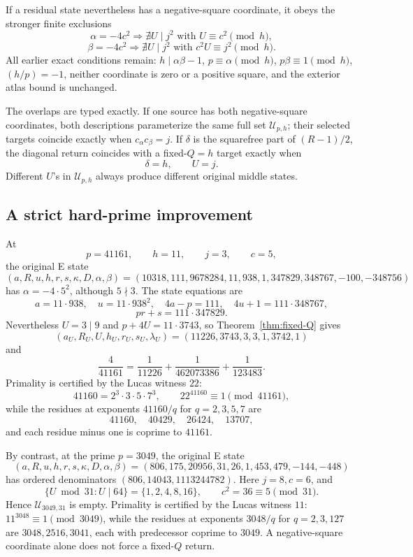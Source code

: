 If a residual state nevertheless has a negative-square coordinate, it obeys
the stronger finite exclusions
\[
 \alpha=-4c^2\Longrightarrow
 \nexists U\mid j^2\text{ with }U\equiv c^2\pmod h,
\]
\[
 \beta=-4c^2\Longrightarrow
 \nexists U\mid j^2\text{ with }c^2U\equiv j^2\pmod h.
\]
All earlier exact conditions remain: \(h\mid\alpha\beta-1\),
\(p\equiv\alpha\pmod h\), \(p\beta\equiv1\pmod h\),
\((h/p)=-1\), neither coordinate is zero or a positive square, and the
exterior atlas bound is unchanged.

The overlaps are typed exactly.  If one source has both negative-square
coordinates, both descriptions parameterize the same full set
\(\mathcal U_{p,h}\); their selected targets coincide exactly when
\(c_\alpha c_\beta=j\).  If \(\delta\) is the squarefree part of
\((R-1)/2\), the diagonal return coincides with a fixed-\(Q=h\) target exactly
when
\[
 \delta=h,\qquad U=j.
\]
Different \(U\)'s in \(\mathcal U_{p,h}\) always produce different original
middle states.

\subsection{A strict hard-prime improvement}

At
\[
 p=41161,\qquad h=11,\qquad j=3,\qquad c=5,
\]
the original E state
\[
 (a,R,u,h,r,s,\kappa,D,\alpha,\beta)
 =(10318,111,9678284,11,938,1,347829,348767,-100,-348756)
\]
has \(\alpha=-4\cdot5^2\), although \(5\nmid3\).  The state equations are
\[
 a=11\cdot938,\quad u=11\cdot938^2,\quad
 4a-p=111,\quad4u+1=111\cdot348767,
\]
\[
 pr+s=111\cdot347829.
\]
Nevertheless \(U=3\mid9\) and \(p+4U=11\cdot3743\), so
Theorem~\ref{thm:fixed-Q} gives
\[
 (a_U,R_U,U,h_U,r_U,s_U,\lambda_U)
 =(11226,3743,3,3,1,3742,1)
\]
and
\[
 \boxed{\frac4{41161}
 =\frac1{11226}+\frac1{462073386}+\frac1{123483}.}      \tag{26}
\]
Primality is certified by the Lucas witness \(22\):
\[
 41160=2^3\cdot3\cdot5\cdot7^3,\qquad
 22^{41160}\equiv1\pmod{41161},
\]
while the residues at exponents \(41160/q\) for \(q=2,3,5,7\) are
\[
 41160,\quad40429,\quad26424,\quad13707,
\]
and each residue minus one is coprime to \(41161\).

By contrast, at the prime \(p=3049\), the original E state
\[
 (a,R,u,h,r,s,\kappa,D,\alpha,\beta)
 =(806,175,20956,31,26,1,453,479,-144,-448)
\]
has ordered denominators \((806,14043,1113244782)\).  Here \(j=8,c=6\), and
\[
 \{U\bmod31:U\mid64\}=\{1,2,4,8,16\},
\qquad c^2=36\equiv5\pmod{31}.
\]
Hence \(\mathcal U_{3049,31}\) is empty.  Primality is certified by the Lucas
witness \(11\): \(11^{3048}\equiv1\pmod{3049}\), while the residues at
exponents \(3048/q\) for \(q=2,3,127\) are \(3048,2516,3041\), each with
predecessor coprime to \(3049\).  A negative-square coordinate alone does not
force a fixed-\(Q\) return.
